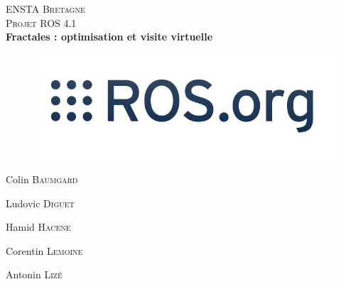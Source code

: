 \documentclass[12pt, openany]{report}
\begin{document}
\author{Colin Baumgard}
\author{Ludovic Diguet}
\author{Hamid Hacene}
\author{Corentin Lemoine}
\author{Antonin Lizé}

\begin{titlepage}
  \begin{sffamily}
    \begin{center}

      \textsc{\LARGE ENSTA Bretagne}\\[2cm]

      \textsc{\Large Projet ROS 4.1}\\[1.5cm]

      { \huge \bfseries Fractales : optimisation et visite virtuelle\\[0.4cm] }
      \vfill

      \begin{figure}[H]
        \hfill \includegraphics[scale=0.6]{logoROS.jpg} \hspace*{\fill}
      \end{figure}

      \vfill


      \begin{minipage}{0.30\textwidth}
        Colin \textsc{Baumgard}
      \end{minipage}
      \begin{minipage}{0.30\textwidth}
        Ludovic \textsc{Diguet}
      \end{minipage}
      \begin{minipage}{0.30\textwidth}
        Hamid \textsc{Hacene}
      \end{minipage}
      \begin{minipage}{0.30\textwidth}
        Corentin \textsc{Lemoine}
      \end{minipage}
      \begin{minipage}{0.30\textwidth}
        Antonin \textsc{Lizé}
      \end{minipage}

    \end{center}
  \end{sffamily}
\end{titlepage}
\end{document}
